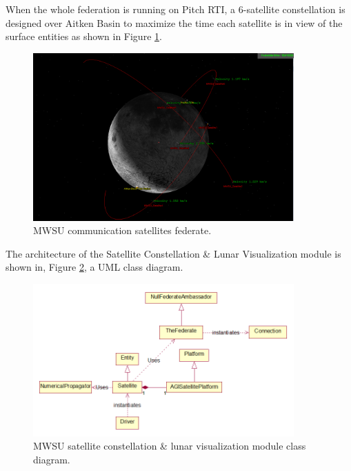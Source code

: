 \documentclass[journal, onecolumn]{IEEEtran}
\begin{document}
When the whole federation is running on Pitch RTI, a 6-satellite constellation is designed over Aitken Basin to maximize the time each satellite is in view of the surface entities as shown in Figure \ref{Satellites}.
\begin{figure}[!htbp]
	\centering
		\includegraphics[width=100mm]{Satellites.PNG}
		\caption{MWSU communication satellites federate.}
	\label{Satellites}
\end{figure}

The architecture of the Satellite Constellation \& Lunar Visualization module is shown in, Figure \ref {Class}, a UML class diagram.

\begin{figure}[!htbp]
	\centering
		\includegraphics[width=100mm]{ClassDiagram.png}
		\caption{MWSU satellite constellation \& lunar visualization module class diagram.}
	\label{Class}
\end{figure}
\end{document}
